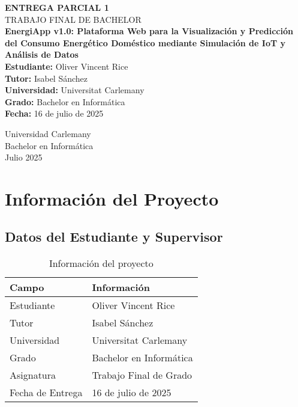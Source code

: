 \documentclass[12pt,a4paper,spanish]{article}
\begin{document}
\begin{titlepage}
\centering
\vspace*{2cm}

{\Huge\bfseries ENTREGA PARCIAL 1}\\[0.5cm]
{\Large TRABAJO FINAL DE BACHELOR}\\[1.5cm]

{\LARGE\bfseries EnergiApp v1.0: Plataforma Web para la Visualización y Predicción del Consumo Energético Doméstico mediante Simulación de IoT y Análisis de Datos}\\[2cm]

{\large
\textbf{Estudiante:} Oliver Vincent Rice\\[0.3cm]
\textbf{Tutor:} Isabel Sánchez\\[0.3cm]
\textbf{Universidad:} Universitat Carlemany\\[0.3cm]
\textbf{Grado:} Bachelor en Informática\\[0.3cm]
\textbf{Fecha:} 16 de julio de 2025\\[0.3cm]
}

\vfill

{\large Universidad Carlemany\\
Bachelor en Informática\\
Julio 2025}

\end{titlepage}

\tableofcontents
\newpage

\section{Información del Proyecto}

\subsection{Datos del Estudiante y Supervisor}

\begin{table}[H]
\centering
\begin{tabular}{ll}
\toprule
\textbf{Campo} & \textbf{Información} \\
\midrule
Estudiante & Oliver Vincent Rice \\
Tutor & Isabel Sánchez \\
Universidad & Universitat Carlemany \\
Grado & Bachelor en Informática \\
Asignatura & Trabajo Final de Grado \\
Fecha de Entrega & 16 de julio de 2025 \\
\bottomrule
\end{tabular}
\caption{Información del proyecto}
\end{table}
\end{document}
